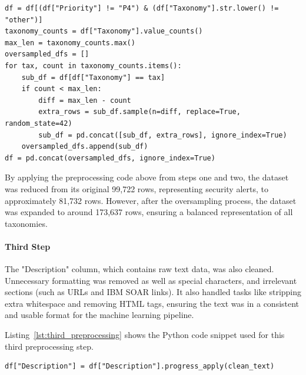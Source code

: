 \vspace{0.2cm}
\noindent
\begin{minipage}{\linewidth}
\begin{verbatim}
df = df[(df["Priority"] != "P4") & (df["Taxonomy"].str.lower() != "other")]
taxonomy_counts = df["Taxonomy"].value_counts()
max_len = taxonomy_counts.max()
oversampled_dfs = []
for tax, count in taxonomy_counts.items():
    sub_df = df[df["Taxonomy"] == tax]
    if count < max_len:
        diff = max_len - count
        extra_rows = sub_df.sample(n=diff, replace=True, random_state=42)
        sub_df = pd.concat([sub_df, extra_rows], ignore_index=True)
    oversampled_dfs.append(sub_df)
df = pd.concat(oversampled_dfs, ignore_index=True)
\end{verbatim}
\label{lst:second_preprocessing}
\end{minipage}
\vspace{0.1cm}

By applying the preprocessing code above from steps one and two, the dataset was reduced from its original 99,722 rows, representing security alerts, to approximately 81,732 rows.
However, after the oversampling process, the dataset was expanded to around 173,637 rows, ensuring a balanced representation of all taxonomies.

\paragraph{Third Step}

The "Description" column, which contains raw text data, was also cleaned. 
Unnecessary formatting was removed as well as special characters, and irrelevant sections (such as URLs and IBM SOAR links). 
It also handled tasks like stripping extra whitespace and removing HTML tags, ensuring the text was in a consistent and usable format for the machine learning pipeline.

Listing~\ref{lst:third_preprocessing} shows the Python code snippet used for this third preprocessing step.

\vspace{0.2cm}
\noindent
\begin{minipage}{\linewidth}
\begin{verbatim}
df["Description"] = df["Description"].progress_apply(clean_text)
\end{verbatim}
\label{lst:third_preprocessing}
\end{minipage}
\vspace{0.1cm}

